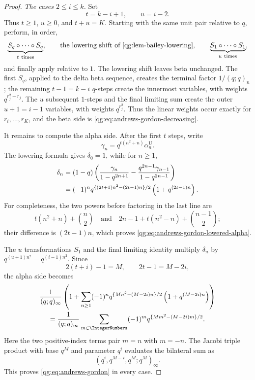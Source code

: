\begin{proof}
\smallskip
\noindent\emph{The cases \(2\le i\le k\).}
Set
\[
  t=k-i+1,\qquad u=i-2.
\]
Thus \(t\ge1\), \(u\ge0\), and \(t+u=K\).  Starting with the same
unit pair relative to \(q\), perform, in order,
\[
  \underbrace{S_q\circ\cdots\circ S_q}_{t\ \mathrm{times}},
  \qquad
  \text{the lowering shift of
        \Cref{qg:lem-bailey-lowering}},
  \qquad
  \underbrace{S_1\circ\cdots\circ S_1}_{u\ \mathrm{times}},
\]
and finally apply  relative to \(1\).
The lowering shift leaves beta unchanged.  The first \(S_q\), applied to
the delta beta sequence, creates the terminal factor \(1/(q;q)_n\);
the remaining \(t-1=k-i\) \(q\)-steps create the innermost variables,
with weights \(q^{r_j^2+r_j}\).  The \(u\) subsequent \(1\)-steps and
the final limiting sum create the outer \(u+1=i-1\) variables, with
weights \(q^{r_j^2}\).  Thus the linear weights occur exactly for
\(r_i,\ldots,r_K\), and the beta side is
\eqref{qg:eq:andrews-gordon-decreasing}.

It remains to compute the alpha side.  After the first \(t\) steps, write
\[
 \gamma_n=q^{t(n^2+n)}\alpha_n^{\mathrm U}.
\]
The lowering formula gives \(\delta_0=1\), while for \(n\ge1\),
\begin{align}
 \delta_n
 &=(1-q)\left(
   \frac{\gamma_n}{1-q^{2n+1}}
   -\frac{q^{2n-1}\gamma_{n-1}}{1-q^{2n-1}}
   \right)\notag\\
 &=(-1)^n
 q^{\{(2t+1)n^2-(2t-1)n\}/2}
 \left(1+q^{(2t-1)n}\right).
 \label{qg:eq:andrews-gordon-lowered-alpha}
\end{align}
For completeness, the two powers before factoring in the last line are
\[
 t(n^2+n)+\binom n2
 \quad\text{and}\quad
 2n-1+t(n^2-n)+\binom{n-1}{2};
\]
their difference is \((2t-1)n\), which proves
\eqref{qg:eq:andrews-gordon-lowered-alpha}.

The \(u\) transformations \(S_1\) and the final limiting identity
multiply \(\delta_n\) by \(q^{(u+1)n^2}=q^{(i-1)n^2}\).
Since
\[
  2(t+i)-1=M,\qquad 2t-1=M-2i,
\]
the alpha side becomes
\begin{multline*}
 \frac1{(q;q)_\infty}
 \left(
 1+\sum_{n\ge1}(-1)^n
 q^{\{Mn^2-(M-2i)n\}/2}
 \left(1+q^{(M-2i)n}\right)
 \right)
 \\
 =
 \frac1{(q;q)_\infty}
 \sum_{m\in\IntegerNumbers}(-1)^m
 q^{\{Mm^2-(M-2i)m\}/2}.
\end{multline*}
Here the two positive-index terms pair \(m=n\) with \(m=-n\).
The Jacobi triple product with base \(q^M\) and parameter \(q^i\)
evaluates the bilateral sum as
\[
  (q^i,q^{M-i},q^M;q^M)_\infty.
\]
This proves \eqref{qg:eq:andrews-gordon} in every case.


\end{proof}
